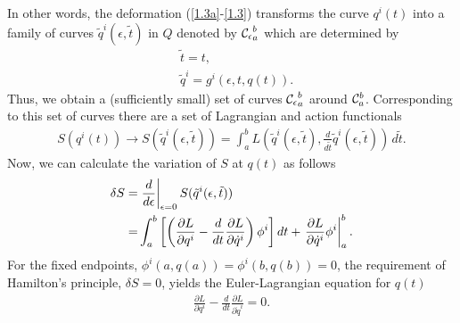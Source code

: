 \documentclass[a4paper,a4paper]{article}
\begin{document}
In other words, the deformation (\ref{1.3a}-\ref{1.3}) transforms the curve
$q^i(t)$ into a family of curves $\tilde{q}^{i}(\epsilon, \tilde{t})$ in $Q$
denoted by ${{\cal
C}_\epsilon}_a^b$ 
which are determined by
\begin{align}
 &\tilde{t}=t,\label{1.5a} \\
&\tilde{q}^i=g^i(\epsilon, t, q(t)).  \label{1.5}
\end{align}
Thus, we obtain a 
(sufficiently small) set of curves ${{\cal
C}_\epsilon}_a^b$ around
${{\cal C}}_a^b$.  
Corresponding to this set of curves
there are a set of Lagrangian and action functionals
\begin{align}
S(q^i(t)) \rightarrow S(\tilde{q}^i(\epsilon, \tilde{t}))=
\int_{{a}}^{{b}}
          L( \tilde{q}^i(\epsilon, \tilde{t}), \frac{d}{d\tilde{t}}
          \tilde{q}^i(\epsilon, \tilde{t}))\,d\tilde{t}.
\label{1.6}
\end{align}
Now, we can calculate the variation of $S$ at $q(t)$ as follows
\begin{align}
\delta S=&\left.\frac{d}{d\epsilon}\right|_{\epsilon=0}S(\tilde{q}^i(\epsilon, \tilde{t}))
           \notag\\
        =&\int_{a}^{b}\left[\left(\frac{\partial L}{\partial q^i}-\frac{d}{dt}
          \frac{\partial L}{\partial \dot{q}^i}\right)\phi^i\right]dt
          +\left.\frac{\partial L}{\partial \dot{q}^i}\phi^i\right|_{a}^{b}.\label{1.7}
\end{align}
For the fixed endpoints, $\phi^i(a, q(a))=\phi^i(b, q(b))=0$, the
requirement of Hamilton's principle, $\delta S =0$, yields the
Euler-Lagrangian equation for $q(t)$
\begin{align}
 \frac{\partial L}{\partial q^i}-\frac{d}{dt}
          \frac{\partial L}{\partial \dot{q}^i}=0. \label{1.8}
\end{align}
\end{document}
